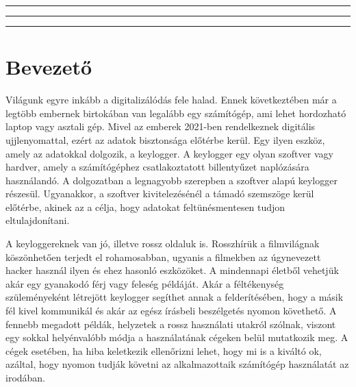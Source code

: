 \documentclass[a4paper, 11pt]{article}
\begin{document}
\noindent \rule[10pt]{\textwidth}{1pt}
\renewcommand{\contentsname}{Tartalomjegyzék}
\tableofcontents
\thispagestyle{empty}
\cleardoublepage

\noindent \rule[10pt]{\textwidth}{1pt}
\renewcommand{\listfigurename}{Ábrák jegyzéke}
\listoffigures
\thispagestyle{empty}
\cleardoublepage

\noindent \rule[10pt]{\textwidth}{1pt}
\renewcommand{\listtablename}{Táblázatok jegyzéke}
\listoftables
\thispagestyle{empty}
\cleardoublepage

\setcounter{page}{1}
\setlength{\parindent}{0.5cm}

\hyphenchar{}
\sloppy

\section{Bevezető}\label{sec:intro}
Világunk egyre inkább a digitalizálódás fele halad. Ennek következtében már a legtöbb embernek birtokában van legalább egy számítógép, ami lehet hordozható laptop vagy asztali gép. Mivel az emberek 2021-ben rendelkeznek digitális ujjlenyomattal, ezért az adatok bisztonsága előtérbe kerül. Egy ilyen eszköz, amely az adatokkal dolgozik, a keylogger. A keylogger egy olyan szoftver vagy hardver, amely a számítógéphez csatlakoztatott billentyűzet naplózására használandó. A dolgozatban a legnagyobb szerepben a szoftver alapú keylogger részesül. Ugyanakkor, a szoftver kivitelezésénél a támadó szemszöge kerül előtérbe, akinek az a célja, hogy adatokat feltünésmentesen tudjon eltulajdonítani.

A keyloggereknek van jó, illetve rossz oldaluk is. Rosszhírük a filmvilágnak köszönhetően terjedt el rohamosabban, ugyanis a filmekben az úgynevezett hacker használ ilyen és ehez hasonló eszközöket. A mindennapi életből vehetjük akár egy gyanakodó férj vagy feleség példáját. Akár a féltékenység szüleményeként létrejött keylogger segíthet annak a felderítésében, hogy a másik fél kivel kommunikál és akár az egész írásbeli beszélgetés nyomon követhető. A fennebb megadott példák, helyzetek a rossz használati utakról szólnak, viszont egy sokkal helyénvalóbb módja a használatának cégeken belül mutatkozik meg. A cégek esetében, ha hiba keletkezik ellenőrizni lehet, hogy mi is a kiváltó ok, azáltal, hogy nyomon tudják követni az alkalmazottaik számítógép használatát az irodában.
\end{document}
